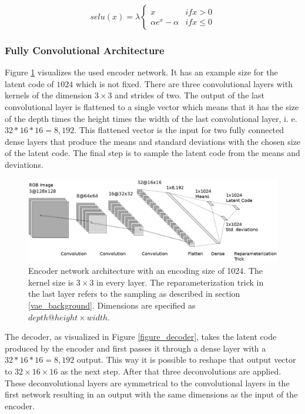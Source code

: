 \begin{equation}
    selu(x) = \lambda \begin{cases}
        x & if x > 0 \\
        \alpha e^x- \alpha & if x \leq 0
    \end{cases}
\end{equation}

\subsubsection{Fully Convolutional Architecture} \label{section_pure_convolutional_architecture}

Figure \ref{figure_pure_convolutional_encoder} visualizes the used encoder network. It has an example size for the
latent code of $1024$ which is not fixed. There are three convolutional
layers with kernels of the dimension $3\times 3$ and strides of two. The output of the last convolutional layer
is flattened to a single vector which means that it has the size of the depth times the height times the width of
the last convolutional layer, i. e. $32*16*16 = 8,192$. This flattened vector is the input for two fully connected
dense layers that produce the means and standard deviations with the chosen size of the latent code. The final step
is to sample the latent code from the means and deviations.

\begin{figure}[h]
    \centering
    \includegraphics[width=\textwidth]{images/figures/encoder_neural_network.png}
    \caption{Encoder network architecture with an encoding size of 1024.
    The kernel size is $3\times 3$ in every layer. The 
    reparameterization trick in the last layer
    refers to the sampling as described in section \ref{vae_background}.
    Dimensions are specified as $depth@height\times width$.} \label{figure_pure_convolutional_encoder}
\end{figure}

The decoder, as visualized in Figure \ref{figure_decoder}, takes the latent code produced by the encoder and 
first passes it through a dense layer with a $32*16*16=8,192$ output. This way it is possible to reshape that
output vector to $32\times 16\times 16$ as the next step. After that three deconvolutions are applied.
These deconvolutional layers are symmetrical to the convolutional layers in the first network resulting in an 
output with the same dimensions as the input of the encoder. 

